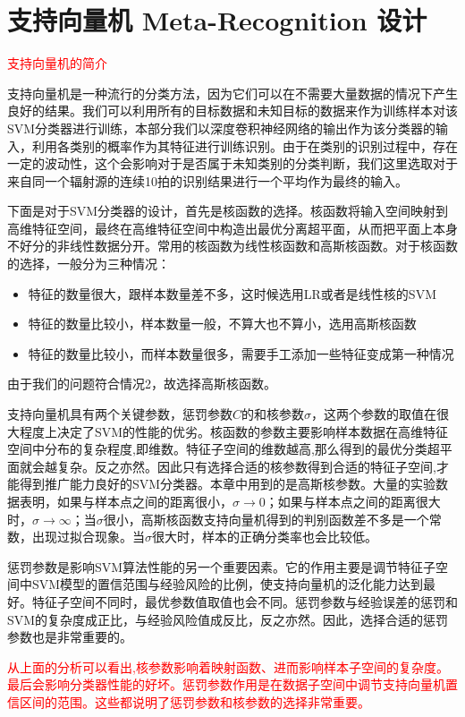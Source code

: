 \section{支持向量机 Meta-Recognition 设计}

\textcolor{red}{支持向量机的简介}

支持向量机是一种流行的分类方法，因为它们可以在不需要大量数据的情况下产生良好的结果。我们可以利用所有的目标数据和未知目标的数据来作为训练样本对该SVM分类器进行训练，本部分我们以深度卷积神经网络的输出作为该分类器的输入，利用各类别的概率作为其特征进行训练识别。由于在类别的识别过程中，存在一定的波动性，这个会影响对于是否属于未知类别的分类判断，我们这里选取对于来自同一个辐射源的连续10拍的识别结果进行一个平均作为最终的输入。

下面是对于SVM分类器的设计，首先是核函数的选择。核函数将输入空间映射到高维特征空间，最终在高维特征空间中构造出最优分离超平面，从而把平面上本身不好分的非线性数据分开。常用的核函数为线性核函数和高斯核函数。对于核函数的选择，一般分为三种情况：
\begin{itemize}
	\item  特征的数量很大，跟样本数量差不多，这时候选用LR或者是线性核的SVM
	\item  特征的数量比较小，样本数量一般，不算大也不算小，选用高斯核函数
	\item  特征的数量比较小，而样本数量很多，需要手工添加一些特征变成第一种情况
\end{itemize}
由于我们的问题符合情况2，故选择高斯核函数。

支持向量机具有两个关键参数，惩罚参数$C$的和核参数$\sigma$，这两个参数的取值在很大程度上决定了SVM的性能的优劣。核函数的参数主要影响样本数据在高维特征空间中分布的复杂程度,即维数。特征子空间的维数越高,那么得到的最优分类超平面就会越复杂。反之亦然。因此只有选择合适的核参数得到合适的特征子空间,才能得到推广能力良好的SVM分类器。本章中用到的是高斯核参数。大量的实验数据表明，如果与样本点之间的距离很小，$\sigma \rightarrow 0$；如果与样本点之间的距离很大时，$\sigma \rightarrow \infty$；当$\sigma$很小，高斯核函数支持向量机得到的判别函数差不多是一个常数，出现过拟合现象。当$\sigma$很大时，样本的正确分类率也会比较低。

惩罚参数是影响SVM算法性能的另一个重要因素。它的作用主要是调节特征子空间中SVM模型的置信范围与经验风险的比例，使支持向量机的泛化能力达到最好。特征子空间不同时，最优参数值取值也会不同。惩罚参数与经验误差的惩罚和SVM的复杂度成正比，与经验风险值成反比，反之亦然。因此，选择合适的惩罚参数也是非常重要的。

\textcolor{red}{从上面的分析可以看出,核参数影响着映射函数、进而影响样本子空间的复杂度。最后会影响分类器性能的好坏。惩罚参数作用是在数据子空间中调节支持向量机置信区间的范围。这些都说明了惩罚参数和核参数的选择非常重要。
}
